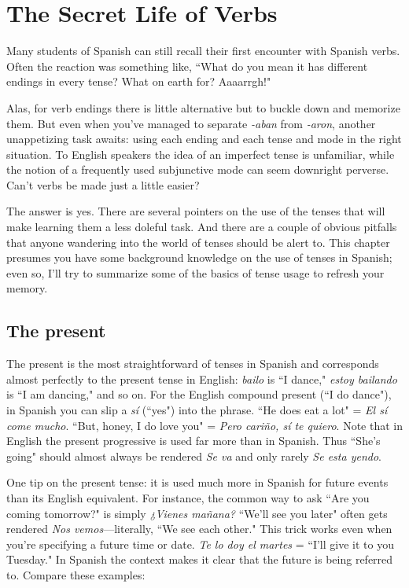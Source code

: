 \chapter{The Secret Life of Verbs}

Many students of Spanish can still recall their first encounter
with Spanish verbs. Often the reaction was something like, ``What do
you mean it has different endings in every tense? What on earth for?
Aaaarrgh!"

Alas, for verb endings there is little alternative but to buckle
down and memorize them. But even when you've managed to separate
\emph{-aban} from \emph{-aron}, another unappetizing task awaits: using each ending
and each tense and mode in the right situation. To English speakers
the idea of an imperfect tense is unfamiliar, while the notion of a frequently used subjunctive mode can seem downright perverse. Can't
verbs be made just a little easier?

The answer is yes. There are several pointers on the use of the
tenses that will make learning them a less doleful task. And there are
a couple of obvious pitfalls that anyone wandering into the world of
tenses should be alert to. This chapter presumes you have some background knowledge on the use of tenses in Spanish; even so, I'll try to
summarize some of the basics of tense usage to refresh your memory.

\section{The present}

The present is the most straightforward of tenses in Spanish
and corresponds almost perfectly to the present tense in English: \emph{bailo}
is ``I dance," \emph{estoy bailando} is ``I am dancing," and so on. For the English compound present (``I do dance"), in Spanish you can slip a \emph{sí}
(``yes") into the phrase. ``He does eat a lot" = \emph{El sí come mucho}. ``But,
honey, I do love you" = \emph{Pero cariño, sí te quiero}. Note that in English
the present progressive is used far more than in Spanish. Thus ``She's
going" should almost always be rendered \emph{Se va} and only rarely \emph{Se esta
yendo}.

One tip on the present tense: it is used much more in Spanish
for future events than its English equivalent. For instance, the common way to ask ``Are you coming tomorrow?" is simply \emph{¿Vienes mañana?} ``We'll see you later" often gets rendered \emph{Nos vemos}---literally,
``We see each other." This trick works even when you're specifying a
future time or date. \emph{Te lo doy el martes} = ``I'll give it to you Tuesday."
In Spanish the context makes it clear that the future is being referred
to. Compare these examples:

